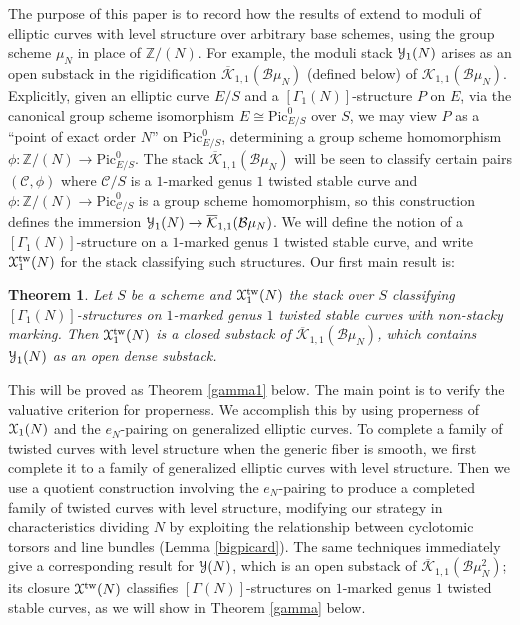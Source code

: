 \documentclass[11pt]{amsart}
\newtheorem{theorem}[subsection]{Theorem}
\theoremstyle{definition}
\begin{document}
The purpose of this paper is to record how the results of \cite{ACV} extend to moduli of elliptic curves with level structure over arbitrary base schemes, using the group scheme $\mu_N$ in place of $\mathbb{Z}/(N)$. For example, the moduli stack ${\mathbf{\EuScript{Y}}}_1(N)$ arises as an open substack in the rigidification $\overline{\mathcal{K}}_{1,1}({\mathcal{B}}\mu_N)$ (defined below) of ${\mathcal{K}}_{1,1}({\mathcal{B}}\mu_N)$. Explicitly, given an elliptic curve $E/S$ and a $[\Gamma_1(N)]$-structure $P$ on $E$, via the canonical group scheme isomorphism $E \cong \mathrm{Pic}^0_{E/S}$ over $S$, we may view $P$ as a ``point of exact order $N$'' on $\mathrm{Pic}^0_{E/S}$, determining a group scheme homomorphism $\phi: \mathbb{Z}/(N) \rightarrow \mathrm{Pic}^0_{E/S}$. The stack $\overline{\mathcal{K}}_{1,1}({\mathcal{B}}\mu_N)$ will be seen to classify certain pairs $({\mathcal{C}},\phi)$ where ${\mathcal{C}}/S$ is a $1$-marked genus $1$ twisted stable curve and $\phi:\mathbb{Z}/(N) \rightarrow \mathrm{Pic}^0_{{\mathcal{C}}/S}$ is a group scheme homomorphism, so this construction defines the immersion ${\mathbf{\EuScript{Y}}}_1(N) \rightarrow \overline{\mathcal{K}}_{1,1}({\mathcal{B}}\mu_N)$. We will define the notion of a $[\Gamma_1(N)]$-structure on a $1$-marked genus $1$ twisted stable curve, and write ${\mathbf{\EuScript{X}}}^{\mathrm{tw}}_1(N)$ for the stack classifying such structures. Our first main result is:
\begin{theorem}\label{firstgamma1}
Let $S$ be a scheme and ${\mathbf{\EuScript{X}}}^{\mathrm{tw}}_1(N)$ the stack over $S$ classifying $[\Gamma_1(N)]$-structures on $1$-marked genus $1$ twisted stable curves with non-stacky marking. Then ${\mathbf{\EuScript{X}}}^{\mathrm{tw}}_1(N)$ is a closed substack of $\overline{\mathcal{K}}_{1,1}({\mathcal{B}} \mu_N)$, which contains ${\mathbf{\EuScript{Y}}}_1(N)$ as an open dense substack.
\end{theorem}
This will be proved as Theorem \ref{gamma1} below. The main point is to verify the valuative criterion for properness. We accomplish this by using properness of ${\mathbf{\EuScript{X}}}_1(N)$ and the $e_N$-pairing on generalized elliptic curves. To complete a family of twisted curves with level structure when the generic fiber is smooth, we first complete it to a family of generalized elliptic curves with level structure. Then we use a quotient construction involving the $e_N$-pairing to produce a completed family of twisted curves with level structure, modifying our strategy in characteristics dividing $N$ by exploiting the relationship between cyclotomic torsors and line bundles (Lemma \ref{bigpicard}). The same techniques immediately give a corresponding result for ${\mathbf{\EuScript{Y}}}(N)$, which is an open substack of $\overline{\mathcal{K}}_{1,1}({\mathcal{B}}\mu_N^2)$; its closure ${\mathbf{\EuScript{X}}}^{\mathrm{tw}}(N)$ classifies $[\Gamma(N)]$-structures on $1$-marked genus $1$ twisted stable curves, as we will show in Theorem \ref{gamma} below.
\end{document}
